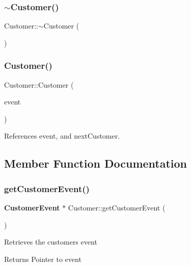 \mbox{\label{classCustomer_ab93fb14683b0393b9c900109f77c2629}} 
\subsubsection{$\sim$\+Customer()}
{\footnotesize\ttfamily Customer\+::$\sim$\+Customer (\begin{DoxyParamCaption}{ }\end{DoxyParamCaption})\hspace{0.3cm}{\ttfamily [virtual]}}

\mbox{\label{classCustomer_a4a0eb55dbdedb6be52d48a817a2d8f6f}} 
\subsubsection{Customer()\hspace{0.1cm}{\footnotesize\ttfamily [2/2]}}
{\footnotesize\ttfamily Customer\+::\+Customer (\begin{DoxyParamCaption}\item[{\textbf{ Customer\+Event} $\ast$}]{event }\end{DoxyParamCaption})}



References event, and next\+Customer.



\subsection{Member Function Documentation}
\mbox{\label{classCustomer_ae89a1bad867beae4d655a72eee491b32}} 
\subsubsection{get\+Customer\+Event()}
{\footnotesize\ttfamily \textbf{ Customer\+Event} $\ast$ Customer\+::get\+Customer\+Event (\begin{DoxyParamCaption}{ }\end{DoxyParamCaption})}

Retrieves the customer\textquotesingle{}s event \begin{DoxyReturn}{Returns}
Pointer to event 
\end{DoxyReturn}


